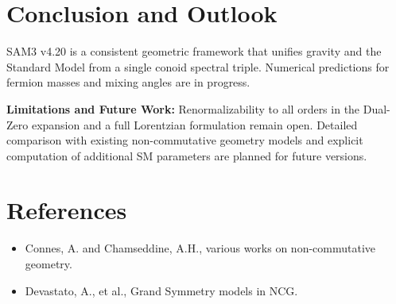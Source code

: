 \documentclass[11pt,a4paper]{article}
\begin{document}
\section{Conclusion and Outlook}
SAM3 v4.20 is a consistent geometric framework that unifies gravity and the Standard Model from a single conoid spectral triple. Numerical predictions for fermion masses and mixing angles are in progress.

\textbf{Limitations and Future Work:}  
Renormalizability to all orders in the Dual-Zero expansion and a full Lorentzian formulation remain open. Detailed comparison with existing non-commutative geometry models and explicit computation of additional SM parameters are planned for future versions.

\section{References}
\begin{itemize}
    \item Connes, A. and Chamseddine, A.H., various works on non-commutative geometry.
    \item Devastato, A., et al., Grand Symmetry models in NCG.
\end{itemize}
\end{document}
